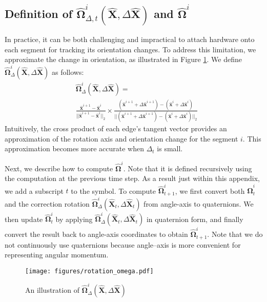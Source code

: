 \subsection{Definition of $\hat{\boldsymbol{\Omega}}^i_{\Delta,t} (\hat{\mathbf{X}},\Delta \hat{\mathbf{X}})$ and $\hat{\boldsymbol{\Omega}}^i$}
\label{sec:appendix_angular_momentum}
In practice, it can be both challenging and impractical to attach hardware onto each segment for tracking its orientation changes. 
To address this limitation, we approximate the change in orientation, as illustrated in Figure \ref{fig:orientation change}.
We define $\hat{\boldsymbol{\Omega}}^i_\Delta (\hat{\mathbf{X}},\Delta \hat{\mathbf{X}} )$ as follows:
\begin{equation}
    \begin{split}
    & \hat{\boldsymbol{\Omega}}^i_\Delta (\hat{\mathbf{X}},\Delta \hat{\mathbf{X}} ) = \\ 
    & \frac{\hat{\mathbf{x}}^{i+1} - \hat{\mathbf{x}}^{i}}{||\hat{\mathbf{x}}^{i+1} - \hat{\mathbf{x}}^{i}||_2}
    \times \frac{(\hat{\mathbf{x}}^{i+1} + \Delta \hat{\mathbf{x}}^{i+1}) - (\hat{\mathbf{x}}^{i}+\Delta \hat{\mathbf{x}}^i)}{||(\hat{\mathbf{x}}^{i+1} + \Delta \hat{\mathbf{x}}^{i+1}) - (\hat{\mathbf{x}}^{i}+\Delta \hat{\mathbf{x}}^i)||_2}
    \end{split}
\end{equation}
Intuitively, the cross product of each edge's tangent vector provides an approximation of the rotation axis and orientation change for the segment $i$.
This approximation becomes more accurate when $\Delta_t$ is small. 

Next, we describe how to compute $\hat{\boldsymbol{\Omega}}^i$. 
Note that it is defined recursively using the computation at the previous time step. 
As a result just within this appendix, we add a subscript $t$ to the symbol.
To compute $\hat{\boldsymbol{\Omega}}^i_{t+1}$, we first convert both 
$\hat{\boldsymbol{\Omega}}^i_{t}$ and the correction rotation 
$\hat{\boldsymbol{\Omega}}^i_{\Delta}(\hat{\mathbf{X}}_{t}, \Delta \hat{\mathbf{X}}_{t})$ 
from angle-axis to quaternions. We then update 
$\hat{\boldsymbol{\Omega}}^i_{t}$ by applying 
$\hat{\boldsymbol{\Omega}}^i_{\Delta}(\hat{\mathbf{X}}_{t}, \Delta \hat{\mathbf{X}}_{t})$ 
in quaternion form, and finally convert the result back to angle-axis coordinates 
to obtain $\hat{\boldsymbol{\Omega}}^i_{t+1}$. 
Note that we do not continuously use quaternions because angle--axis is more 
convenient for representing angular momentum.
\begin{figure}[t]
    \centering
\texttt{[image: figures/rotation\_omega.pdf]}
    \caption{An illustration of $\hat{\boldsymbol{\Omega}}^i_\Delta (\hat{\mathbf{X}},\Delta \hat{\mathbf{X}})$
    }
    \label{fig:orientation change}
\end{figure}